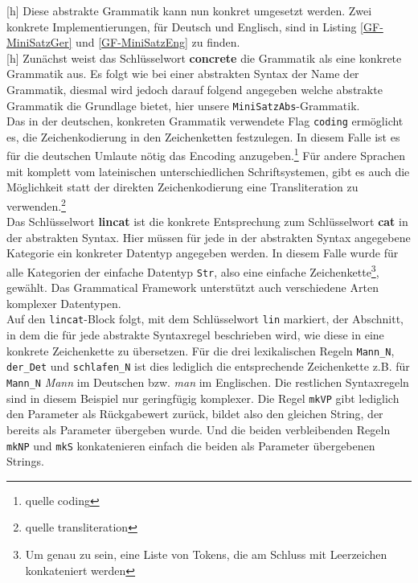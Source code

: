 \documentclass[11pt]{scrartcl}
\begin{document}
[h]
Diese abstrakte Grammatik kann nun konkret umgesetzt werden. Zwei konkrete Implementierungen, für Deutsch und Englisch, sind in Listing \ref{GF-MiniSatzGer} und \ref{GF-MiniSatzEng} zu finden. \\
[h]
[h]
Zunächst weist das Schlüsselwort \textbf{concrete} die Grammatik als eine konkrete Grammatik aus. Es folgt wie bei einer abstrakten Syntax der Name der Grammatik, diesmal wird jedoch darauf folgend angegeben welche abstrakte Grammatik die Grundlage bietet, hier unsere \texttt{MiniSatzAbs}-Grammatik. \\
Das in der deutschen, konkreten Grammatik verwendete Flag \texttt{coding} ermöglicht es, die Zeichenkodierung in den Zeichenketten festzulegen. In diesem Falle ist es für die deutschen Umlaute nötig das Encoding anzugeben.\footnote{quelle coding} Für andere Sprachen mit komplett vom lateinischen unterschiedlichen Schriftsystemen, gibt es auch die Möglichkeit statt der direkten Zeichenkodierung eine Transliteration zu verwenden.\footnote{quelle transliteration}\\
Das Schlüsselwort \textbf{lincat} ist die konkrete Entsprechung zum Schlüsselwort \textbf{cat} in der abstrakten Syntax. Hier müssen für jede in der abstrakten Syntax angegebene Kategorie ein konkreter Datentyp angegeben werden. In diesem Falle wurde für alle Kategorien der einfache Datentyp \texttt{Str}, also eine einfache Zeichenkette\footnote{Um genau zu sein, eine Liste von Tokens, die am Schluss mit Leerzeichen konkateniert werden}, gewählt. Das Grammatical Framework unterstützt auch verschiedene Arten komplexer Datentypen. \\
Auf den \texttt{lincat}-Block folgt, mit dem Schlüsselwort \texttt{lin} markiert, der Abschnitt, in dem die für jede abstrakte Syntaxregel beschrieben wird, wie diese in eine konkrete Zeichenkette zu übersetzen. Für die drei lexikalischen Regeln \texttt{Mann\_N}, \texttt{der\_Det} und \texttt{schlafen\_N} ist dies lediglich die entsprechende Zeichenkette z.B. für \texttt{Mann\_N} \textit{Mann} im Deutschen bzw. \textit{man} im Englischen. Die restlichen Syntaxregeln sind in diesem Beispiel nur geringfügig komplexer. Die Regel \texttt{mkVP} gibt lediglich den Parameter als Rückgabewert zurück, bildet also den gleichen String, der bereits als Parameter übergeben wurde. Und die beiden verbleibenden Regeln \texttt{mkNP} und \texttt{mkS} konkatenieren einfach die beiden als Parameter übergebenen Strings. \\
\end{document}
